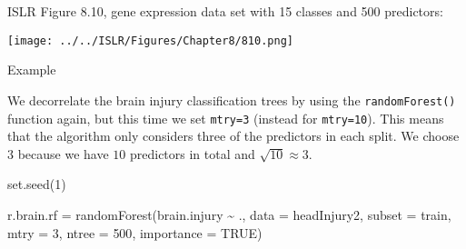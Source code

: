 \documentclass[
  10pt,
  ignorenonframetext,
]{beamer}
\newenvironment{Shaded}{\begin{snugshade}}{\end{snugshade}}
\newcommand{\AttributeTok}[1]{\textcolor[rgb]{0.77,0.63,0.00}{#1}}
\newcommand{\ConstantTok}[1]{\textcolor[rgb]{0.00,0.00,0.00}{#1}}
\newcommand{\DecValTok}[1]{\textcolor[rgb]{0.00,0.00,0.81}{#1}}
\newcommand{\FunctionTok}[1]{\textcolor[rgb]{0.00,0.00,0.00}{#1}}
\newcommand{\NormalTok}[1]{#1}
\newcommand{\OtherTok}[1]{\textcolor[rgb]{0.56,0.35,0.01}{#1}}
\newcommand{\SpecialCharTok}[1]{\textcolor[rgb]{0.00,0.00,0.00}{#1}}
\begin{document}
\begin{frame}
ISLR Figure 8.10, gene expression data set with 15 classes and 500
predictors: \vspace{-3mm}

\centering

\texttt{[image: ../../ISLR/Figures/Chapter8/810.png]}
\end{frame}

\begin{frame}[fragile]
\begin{block}{Example}
\protect\hypertarget{example-1}{}
\vspace{2mm}

We decorrelate the brain injury classification trees by using the
\texttt{randomForest()} function again, but this time we set
\texttt{mtry=3} (instead for \texttt{mtry=10}). This means that the
algorithm only considers three of the predictors in each split. We
choose \(3\) because we have \(10\) predictors in total and
\(\sqrt{10}\approx 3\).

\vspace{2mm}

\scriptsize

\begin{Shaded}
\begin{Highlighting}[]
\FunctionTok{set.seed}\NormalTok{(}\DecValTok{1}\NormalTok{)}

\NormalTok{r.brain.rf }\OtherTok{=} \FunctionTok{randomForest}\NormalTok{(brain.injury }\SpecialCharTok{\textasciitilde{}}\NormalTok{ ., }\AttributeTok{data =}\NormalTok{ headInjury2, }\AttributeTok{subset =}\NormalTok{ train,}
    \AttributeTok{mtry =} \DecValTok{3}\NormalTok{, }\AttributeTok{ntree =} \DecValTok{500}\NormalTok{, }\AttributeTok{importance =} \ConstantTok{TRUE}\NormalTok{)}
\end{Highlighting}
\end{Shaded}
\end{block}
\end{frame}
\end{document}
